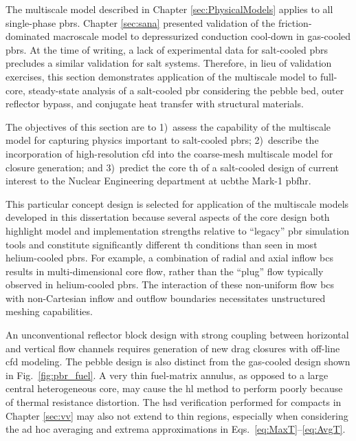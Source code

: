 The multiscale model described in Chapter \ref{sec:PhysicalModels} applies to all single-phase \glspl{pbr}. Chapter \ref{sec:sana} presented validation of the friction-dominated macroscale model to depressurized conduction cool-down in gas-cooled \glspl{pbr}. At the time of writing, a lack of experimental data for salt-cooled \glspl{pbr} precludes a similar validation for salt systems. Therefore, in lieu of validation exercises, this section demonstrates application of the multiscale model to full-core, steady-state analysis of a salt-cooled \gls{pbr} considering the pebble bed, outer reflector bypass, and conjugate heat transfer with structural materials. 

The objectives of this section are to 1)~assess the capability of the multiscale model for capturing physics important to salt-cooled \glspl{pbr}; 2)~describe the incorporation of high-resolution \gls{cfd} into the coarse-mesh multiscale model for closure generation; and 3)~predict the core \gls{th} of a salt-cooled design of current interest to the Nuclear Engineering department at \gls{ucb}\mdash the Mark-1 \gls{pbfhr}. 

This particular concept design is selected for application of the multiscale models developed in this dissertation because several aspects of the core design both highlight model and implementation strengths relative to ``legacy'' \gls{pbr} simulation tools and constitute significantly different \gls{th} conditions than seen in most helium-cooled \glspl{pbr}. For example, a combination of radial and axial inflow \glspl{bc} results in multi-dimensional core flow, rather than the ``plug'' flow typically observed in helium-cooled \glspl{pbr}. The interaction of these non-uniform flow \glspl{bc} with non-Cartesian inflow and outflow boundaries necessitates unstructured meshing capabilities. 

An unconventional reflector block design with strong coupling between horizontal and vertical flow channels requires generation of new drag closures with off-line \gls{cfd} modeling. The pebble design is also distinct from the gas-cooled design shown in Fig.\ \ref{fig:pbr_fuel}. A very thin fuel-matrix annulus, as opposed to a large central heterogeneous core, may cause the \gls{hl} method to perform poorly because of thermal resistance distortion. The \gls{hsd} verification performed for compacts in Chapter \ref{sec:vv} may also not extend to thin regions, especially when considering the ad hoc averaging and extrema approximations in Eqs.\ \eqref{eq:MaxT}--\eqref{eq:AvgT}.

